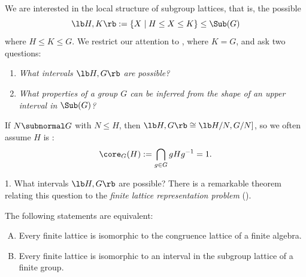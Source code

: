 \begin{frame}[fragile,label=LocalStructure]{}
We are interested in the local structure of subgroup lattices, that is,
the possible 
\[
\lb H, K \rb := \{X \mid H \leq X \leq K\} \leq \Sub(G)
\]
where $H \leq K \leq G$. 
\vskip4mm
We restrict our attention to , where $K = G$, and ask two
questions:
\vskip4mm
\begin{enumerate}
\item \emph{What intervals $\lb H,G \rb$ are possible?}
\vskip4mm
\item \emph{What properties of a group $G$ can be inferred from the shape of an
  upper interval in $\Sub(G)$?}
\end{enumerate}
\end{frame}

\begin{frame}[fragile,label=LocalStructureCoreFree]{}
If $N \subnormal G$
with $N \leq H$, then  $\lb H, G \rb\cong \lb H/N, G/N]$, 
\vskip2mm
so we often assume $H$ is :
\[
\core_G(H) := \bigcap_{g\in G} gHg^{-1} = 1.
\]
\end{frame}

\begin{frame}[fragile,label=LocalStructureNote]{}
\end{frame}

\begin{frame}[fragile,label=LocalStructure]{1. What intervals $\lb H,G \rb$ are possible?}
There is a remarkable theorem relating this question to the \emph{finite lattice representation problem} (\FLRP).
\vskip5mm
\begin{theorem}
\label{thm:P5}
The following statements are equivalent:
\begin{enumerate}[(A)]
\item Every finite lattice is isomorphic to
  the congruence lattice of a finite algebra.
\item Every finite lattice is isomorphic to
  an interval in the subgroup lattice of a finite group.
\end{enumerate}
\end{theorem}
\end{frame}

